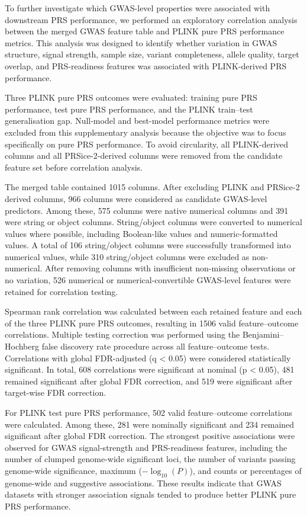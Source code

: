 \documentclass[11pt,a4paper]{article}
\begin{document}
To further investigate which GWAS-level properties were associated with downstream PRS performance, we performed an exploratory correlation analysis between the merged GWAS feature table and PLINK pure PRS performance metrics. This analysis was designed to identify whether variation in GWAS structure, signal strength, sample size, variant completeness, allele quality, target overlap, and PRS-readiness features was associated with PLINK-derived PRS performance.

Three PLINK pure PRS outcomes were evaluated: training pure PRS performance, test pure PRS performance, and the PLINK train--test generalisation gap. Null-model and best-model performance metrics were excluded from this supplementary analysis because the objective was to focus specifically on pure PRS performance. To avoid circularity, all PLINK-derived columns and all PRSice-2-derived columns were removed from the candidate feature set before correlation analysis.

The merged table contained 1015 columns. After excluding PLINK and PRSice-2 derived columns, 966 columns were considered as candidate GWAS-level predictors. Among these, 575 columns were native numerical columns and 391 were string or object columns. String/object columns were converted to numerical values where possible, including Boolean-like values and numeric-formatted values. A total of 106 string/object columns were successfully transformed into numerical values, while 310 string/object columns were excluded as non-numerical. After removing columns with insufficient non-missing observations or no variation, 526 numerical or numerical-convertible GWAS-level features were retained for correlation testing.

Spearman rank correlation was calculated between each retained feature and each of the three PLINK pure PRS outcomes, resulting in 1506 valid feature--outcome correlations. Multiple testing correction was performed using the Benjamini--Hochberg false discovery rate procedure across all feature--outcome tests. Correlations with global FDR-adjusted (q < 0.05) were considered statistically significant. In total, 608 correlations were significant at nominal (p < 0.05), 481 remained significant after global FDR correction, and 519 were significant after target-wise FDR correction.

For PLINK test pure PRS performance, 502 valid feature--outcome correlations were calculated. Among these, 281 were nominally significant and 234 remained significant after global FDR correction. The strongest positive associations were observed for GWAS signal-strength and PRS-readiness features, including the number of clumped genome-wide significant loci, the number of variants passing genome-wide significance, maximum ($-\log_{10}(P)$), and counts or percentages of genome-wide and suggestive associations. These results indicate that GWAS datasets with stronger association signals tended to produce better PLINK pure PRS performance.
\end{document}
